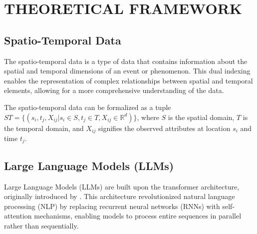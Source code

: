 \chapter{THEORETICAL FRAMEWORK}


\section{Spatio-Temporal Data}

The spatio-temporal data is a type of data that contains information about the spatial and temporal dimensions of an event or phenomenon. 
This dual indexing enables the representation of complex relationships between spatial and temporal elements, allowing for a more comprehensive understanding of the data.

The spatio-temporal data can be formalized as a tuple $ST = \{ (s_i, t_j, X_{ij} | s_i \in S , t_j \in T , X_{ij} \in \mathbb{R}^d )\}$, where $S$ is the spatial domain, $T$ is the temporal domain, and $X_{ij}$ signifies the observed attributes at location $s_i$ and time $t_j$.










\section{Large Language Models (LLMs)}

Large Language Models (LLMs) are built upon the transformer architecture, originally introduced by \cite{vaswani2023attentionneed}. This architecture revolutionized natural language processing (NLP) by replacing recurrent neural networks (RNNs) with self-attention mechanisms, enabling models to process entire sequences in parallel rather than sequentially.

